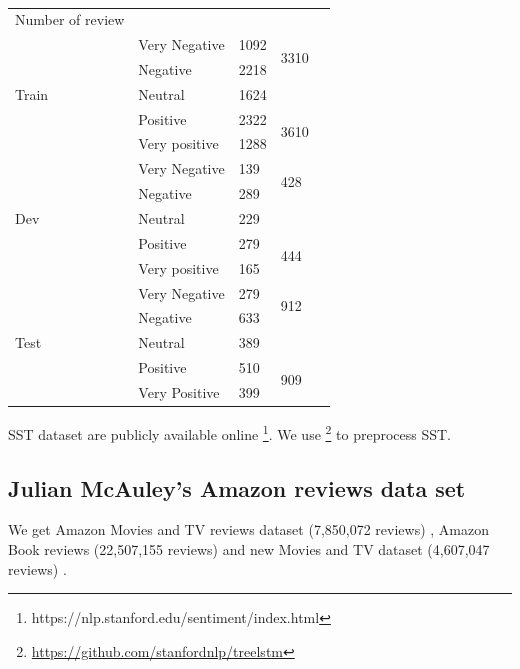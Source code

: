 \begin{table}[H]
	\centering
	\caption{}
	\label{table:sststatistic}
	\begin{tabular}{lllll}
		Number of review       &               &      &                       &  \\ \cline{1-4}
		\multirow{5}{*}{Train} & Very Negative & 1092 & \multirow{2}{*}{3310} &  \\ \cline{2-3}
		& Negative      & 2218 &                       &  \\ \cline{2-4}
		& Neutral       & 1624 &                       &  \\ \cline{2-4}
		& Positive      & 2322 & \multirow{2}{*}{3610} &  \\ \cline{2-3}
		& Very positive & 1288 &                       &  \\ \cline{1-4}
		\multirow{5}{*}{Dev}   & Very Negative & 139  & \multirow{2}{*}{428}  &  \\ \cline{2-3}
		& Negative      & 289  &                       &  \\ \cline{2-4}
		& Neutral       & 229  &                       &  \\ \cline{2-4}
		& Positive      & 279  & \multirow{2}{*}{444}  &  \\ \cline{2-3}
		& Very positive & 165  &                       &  \\ \cline{1-4}
		\multirow{5}{*}{Test}  & Very Negative & 279  & \multirow{2}{*}{912}  &  \\ \cline{2-3}
		& Negative      & 633  &                       &  \\ \cline{2-4}
		& Neutral       & 389  &                       &  \\ \cline{2-4}
		& Positive      & 510  & \multirow{2}{*}{909}  &  \\ \cline{2-3}
		& Very Positive & 399  &                       &  \\ \cline{2-4}
	\end{tabular}
\end{table}


SST dataset are publicly available online \footnote{https://nlp.stanford.edu/sentiment/index.html}. We use
\footnote{\url{https://github.com/stanfordnlp/treelstm}} to preprocess SST.

\subsection{Julian McAuley's Amazon reviews data set}
We get Amazon Movies and TV reviews dataset (7,850,072 reviews) \cite{mcauley2013hidden}, Amazon Book reviews (22,507,155 reviews) and new Movies and TV dataset (4,607,047 reviews) \cite{he2016ups}. 

